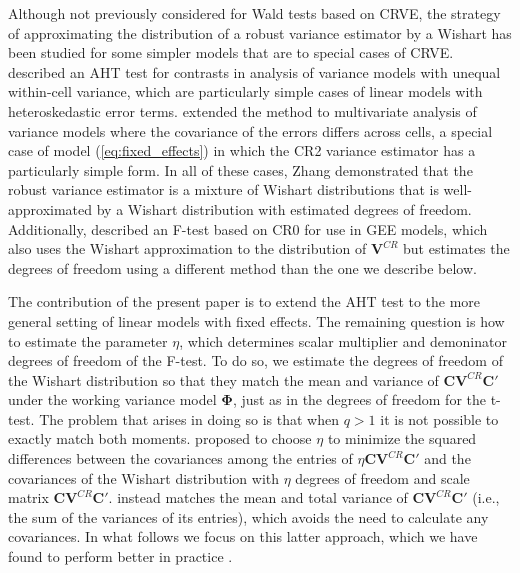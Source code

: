\documentclass[12pt]{article}\usepackage[]{graphicx}\usepackage[]{color}
\newcommand{\bm}{\mathbf}
\newcommand{\bs}{\boldsymbol}
\begin{document}
Although not previously considered for Wald tests based on CRVE, the strategy of approximating the distribution of a robust variance estimator by a Wishart has been studied for some simpler models that are to special cases of CRVE. 
\citet{Zhang2013tests, Zhang2012twowayANOVA} described an AHT test for contrasts in analysis of variance models with unequal within-cell variance, which are particularly simple cases of linear models with heteroskedastic error terms. 
\citet{Zhang2012MANOVA} extended the method to multivariate analysis of variance models where the covariance of the errors differs across cells, a special case of model (\ref{eq:fixed_effects}) in which the CR2 variance estimator has a particularly simple form. In all of these cases, Zhang demonstrated that the robust variance estimator is a mixture of Wishart distributions that is well-approximated by a Wishart distribution with estimated degrees of freedom. 
Additionally, \citet{Pan2002small} described an F-test based on CR0 for use in GEE models, which also uses the Wishart approximation to the distribution of $\bm{V}^{CR}$ but estimates the degrees of freedom using a different method than the one we describe below.

The contribution of the present paper is to extend the AHT test to the more general setting of linear models with fixed effects. 
The remaining question is how to estimate the parameter $\eta$, which determines scalar multiplier and demoninator degrees of freedom of the F-test. 
To do so, we estimate the degrees of freedom of the Wishart distribution so that they match the mean and variance of $\bm{C}\bm{V}^{CR} \bm{C}'$ under the working variance model $\bs\Phi$, just as in the degrees of freedom for the t-test. 
The problem that arises in doing so is that when $q > 1$ it is not possible to exactly match both moments. 
\cite{Pan2002small} proposed to choose $\eta$ to minimize the squared differences between the covariances among the entries of $\eta \bm{C}\bm{V}^{CR}\bm{C}'$ and the covariances of the Wishart distribution with $\eta$ degrees of freedom and scale matrix $\bm{C}\bm{V}^{CR}\bm{C}'$. 
\citet{Zhang2012MANOVA} instead matches the mean and total variance of $\bm{C}\bm{V}^{CR}\bm{C}'$ (i.e., the sum of the variances of its entries), which avoids the need to calculate any covariances. 
In what follows we focus on this latter approach, which we have found to perform better in practice \citep{Tipton2015small}.
\end{document}
